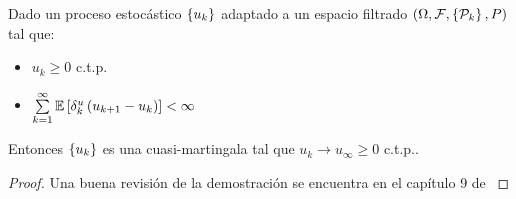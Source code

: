 \begin{theorem}
	\label{theorem: Convergencia de cuasi martingalas}
	Dado un proceso estoc\'astico $\left\lbrace u_k\right\rbrace$ adaptado a un espacio filtrado $\left(\Omega, \mathcal{F}, \left\lbrace\mathcal{P}_k\right\rbrace, P\right)$ tal que:
	
	\begin{itemize}
		\item $u_k \geq 0$ c.t.p.
		\item $\sum\limits_{k=1}^{\infty} {\mathbb{E} \left[\delta^u_k\left(u_{k+1} - u_k\right)\right]} < \infty$
	\end{itemize}
	
	Entonces $\left\lbrace u_k\right\rbrace$ es una cuasi-martingala tal que $u_k \rightarrow u_{\infty} \geq 0$ c.t.p..
	
\end{theorem}

\begin{proof}
	Una buena revisi\'on de la demostraci\'on se encuentra en el cap\'itulo 9 de \cite{metivier:1983}
\end{proof}
